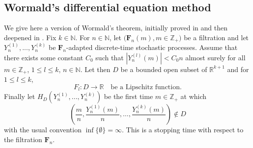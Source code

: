 \documentclass[a4, 11pt]{article}
\numberwithin{equation}{section}
\theoremstyle{plain}
\theoremstyle{definition}
\theoremstyle{remark}
\begin{document}
\subsection{Wormald's differential equation method}

We give here a version of Wormald's theorem, initially proved in \cite{wormald95} and then deepened in \cite{wormald97,Warnke19}. Fix $k \in \mathbb N$. For $n \in \mathbb N$, let $\big(\mathbf F_n(m),m \in \mathbb Z_+ \big)$ be a filtration and let $Y^{(1)}_n,...,Y^{(k)}_n$ be $\mathbf F_{n}$-adapted discrete-time stochastic processes. Assume that there exists some constant $C_0$ such that $|Y_n^{(l)}(m)| <C_0 n$ almost surely for all $m \in \mathbb Z_+$, $1 \leq l \leq k$, $n \in \mathbb N$. Let then $D$ be a bounded open subset of $\mathbb{R}^{k+1}$ and for $1\leq l\leq k$, $$F_l:D \rightarrow \mathbb R\quad  \text{be a Lipschitz function}.$$ Finally let $H_D(Y^{(1)}_n,...,Y^{(k)}_n)$ be the first time $m \in \mathbb Z_+$ at which $$\left(\frac{m}{n},\frac{Y^{(1)}_n(m)}{n},\ldots,\frac{Y^{(k)}_n(m)}{n}\right)\notin D$$
with the usual convention $\inf{\{\emptyset\}}=\infty$. This  is a stopping time with respect to the filtration $\mathbf F_{n}$.
\end{document}
